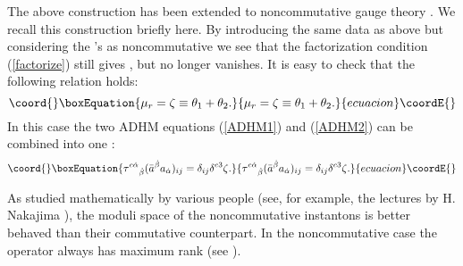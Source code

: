 \documentclass[a4paper,a4paper]{article}
\begin{document}
The above construction has been extended to noncommutative gauge theory \cite%
{Schwarz}. We recall this construction briefly here. By introducing the same
data as above but considering the \coordHE{}'s as noncommutative we see that the
factorization condition (\ref{factorize}) still gives \coordHE{}, but \coordHE{}
no longer vanishes. It is easy to check that the following relation holds:
\begin{equation}\coord{}\boxEquation{
\mu_r=\zeta\equiv\theta_1+\theta_2.
}{
\mu_r=\zeta\equiv\theta_1+\theta_2.
}{ecuacion}\coordE{}\end{equation}
In this case the two ADHM equations (\ref{ADHM1}) and (\ref{ADHM2}) can be
combined into one \cite{Paperd}:
\begin{equation}\coord{}\boxEquation{  \label{ADHM}
\tau^{c\dot\alpha}{}_{\dot\beta}(\bar a^{\dot\beta}
a_{\dot\alpha})_{ij}=\delta_{ij}\delta^{c3}\zeta.
}{  \tau^{c\dot\alpha}{}_{\dot\beta}(\bar a^{\dot\beta}
a_{\dot\alpha})_{ij}=\delta_{ij}\delta^{c3}\zeta.
}{ecuacion}\coordE{}\end{equation}

As studied mathematically by various people (see, for example, the lectures
by H. Nakajima \cite{Nakajima}), the moduli space of the noncommutative
instantons is better behaved than their commutative counterpart. In the
noncommutative case the operator \myHighlight{$\Delta^\dagger\Delta$}\coordHE{} always has maximum
rank (see \cite{Reviewa}).
\end{document}
